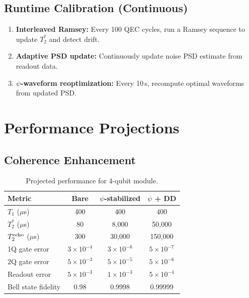 \documentclass[11pt,letterpaper]{article}
\begin{document}
\subsection{Runtime Calibration (Continuous)}

\begin{enumerate}
\item \textbf{Interleaved Ramsey:} Every 100 QEC cycles, run a Ramsey
sequence to update $T_2^*$ and detect drift.
\item \textbf{Adaptive PSD update:} Continuously update noise PSD
estimate from readout data.
\item \textbf{$\psi$-waveform reoptimization:} Every 10\,s, recompute
optimal waveforms from updated PSD.
\end{enumerate}

\section{Performance Projections}

\subsection{Coherence Enhancement}

\begin{table}[H]
\caption{Projected performance for 4-qubit module.}
\begin{tabular}{lccc}
\toprule
\textbf{Metric} & \textbf{Bare} & \textbf{$\psi$-stabilized}
& \textbf{$\psi$ + DD} \\
\midrule
$T_1$ ($\mu$s) & 400 & 400 & 400 \\
$T_2^*$ ($\mu$s) & 80 & 8,000 & 50,000 \\
$T_2^{\rm echo}$ ($\mu$s) & 300 & 30,000 & 150,000 \\
1Q gate error & $3\times 10^{-4}$ & $3\times 10^{-6}$ & $5\times 10^{-7}$ \\
2Q gate error & $5\times 10^{-3}$ & $5\times 10^{-5}$ & $5\times 10^{-6}$ \\
Readout error & $5\times 10^{-3}$ & $1\times 10^{-3}$ & $5\times 10^{-4}$ \\
Bell state fidelity & 0.98 & 0.9998 & 0.99999 \\
\bottomrule
\end{tabular}
\end{table}
\end{document}
